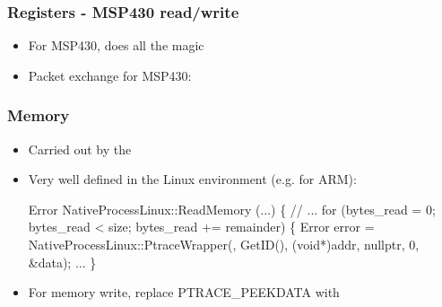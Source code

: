 \begin{frame}[fragile]
\frametitle{Registers - MSP430 read/write}
\begin{itemize}
    [triangle]
    \item For MSP430,  does all the magic
    \item Packet exchange for MSP430:
\end{itemize}
\end{frame}

\begin{frame}[fragile]
\frametitle{Memory}
\begin{itemize}    
    \setlength\itemsep{1em}
    [triangle]
    \item Carried out by the 
    \item Very well defined in the Linux environment (e.g. for ARM):
\begin{codebox2}
Error
NativeProcessLinux::ReadMemory (...)
\{
    // ... 
    for (bytes_read = 0; bytes_read < size; bytes_read += remainder)
    \{
        Error error = NativeProcessLinux::PtraceWrapper(,
                                                        GetID(),
                                                        (void*)addr,
                                                        nullptr,
                                                        0,
                                                        &data);
       ...
\}

\end{codebox2}
\item For memory write, replace PTRACE\_PEEKDATA with 
\end{itemize}
\end{frame}

